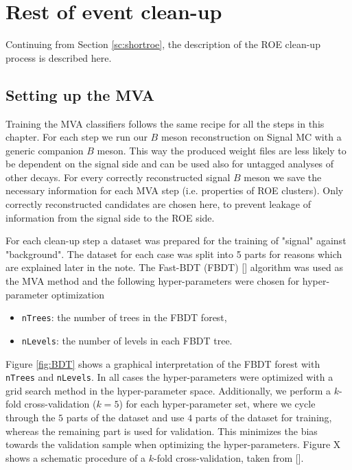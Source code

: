 \documentclass[oneside,a4paper,openany,12pt]{scrbook}
\begin{document}
\chapter{Rest of event clean-up}
\label{ch:roe}

Continuing from Section \ref{sc:shortroe}, the description of the ROE clean-up process is described here. 

\section{Setting up the MVA}

Training the MVA classifiers follows the same recipe for all the steps in this chapter. For each step we run our $B$ meson reconstruction on Signal MC with a generic companion $B$ meson. This way the produced weight files are less likely to be dependent on the signal side and can be used also for untagged analyses of other decays. For every correctly reconstructed signal $B$ meson we save the necessary information for each MVA step (i.e. properties of ROE clusters). Only correctly reconstructed candidates are chosen here, to prevent leakage of information from the signal side to the ROE side.

For each clean-up step a dataset was prepared for the training of "signal" against "background". The dataset for each case was split into 5 parts for reasons which are explained later in the note. The Fast-BDT (FBDT) [] algorithm was used as the MVA method and the following hyper-parameters were chosen for hyper-parameter optimization
\begin{itemize}
\item \texttt{nTrees}: the number of trees in the FBDT forest,
\item \texttt{nLevels}: the number of levels in each FBDT tree.
\end{itemize}

Figure \ref{fig:BDT} shows a graphical interpretation of the FBDT forest with \texttt{nTrees} and \texttt{nLevels}. In all cases the hyper-parameters were optimized with a grid search method in the hyper-parameter space. Additionally, we perform a $k$-fold cross-validation ($k=5$) for each hyper-parameter set, where we cycle through the $5$ parts of the dataset and use $4$ parts of the dataset for training, whereas the remaining part is used for validation. This minimizes the bias towards the validation sample when optimizing the hyper-parameters. Figure X shows a schematic procedure of a $k$-fold cross-validation, taken from [].
\end{document}

